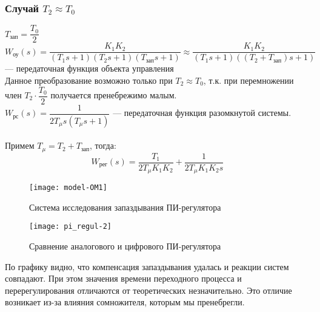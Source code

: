             \subsubsection{Случай $ T_2 \approx T_0 $}
                $ T_\text{зап} = \dfrac{T_0}{2} $\\
                $W_{\mbox{оу}}(s)=\dfrac{K_1 K_2}{(T_1s+1)(T_2s+1)(T_\text{зап}s+1)} \approx \dfrac{K_1 K_2}{(T_1s+1)((T_2+T_\text{зап})s+1)}$ --- передаточная функция объекта управления\\
                Данное преобразование возможно только при $ T_2 \approx T_0 $, т.к. при перемножении член $ T_2\cdot\dfrac{T_0}{2} $ получается пренебрежимо малым.\\
                $W_{\mbox{рс}}(s)=\dfrac{1}{2T_\mu s(T_\mu s+1)}$ --- передаточная функция разомкнутой системы.\\
                \vspace{1em}\\
                Примем  $ T_\mu = T_2+T_\text{зап} $, тогда:
                \[
                    W_{\mbox{рег}}(s)=\dfrac{T_1}{2T_\mu K_1 K_2}+\dfrac{1}{2T_\mu K_1 K_2 s}
                \]
                    \begin{figure}[H]
                        \centering\texttt{[image: model-OM1]}
                        \caption{Система исследования запаздывания ПИ-регулятора}
                    \end{figure}
                    \begin{figure}[H]
                        \centering\texttt{[image: pi\_regul-2]}
                        \caption{Сравнение аналогового и цифрового ПИ-регулятора}
                    \end{figure}
                    
                    По графику видно, что компенсация запаздывания удалась и реакции систем совпадают. При этом значения времени переходного процесса и перерегулирования отличаются от теоретических незначительно. Это отличие возникает из-за влияния сомножителя, которым мы пренебрегли.
                    
